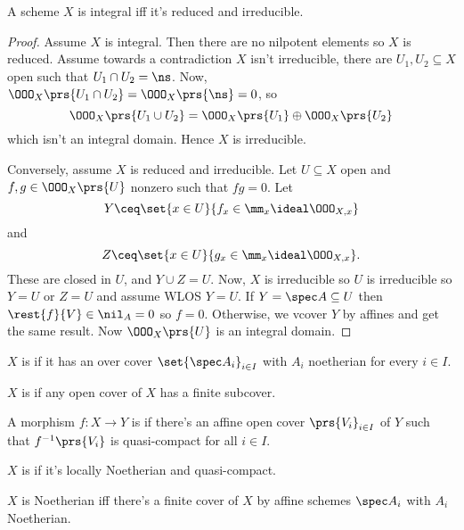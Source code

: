 \documentclass[10pt,a4paper,twoside,openany,hidelinks]{book}
\begin{document}
\begin{proposition}
A scheme $X$ is integral iff it's reduced and irreducible.
\end{proposition}

\begin{proof}
Assume $X$ is integral. Then there are no nilpotent elements so $X$ is reduced.
Assume towards a contradiction $X$ isn't irreducible, there are $U_1, U_2 \subseteq X$ open such that $U_1 \cap U_2 = \ns$.
Now, $\OOO_X\prs{U_1 \cap U_2} = \OOO_X\prs{\ns} = 0$, so
$$\OOO_X\prs{U_1 \cup U_2} = \OOO_X\prs{U_1} \oplus \OOO_X\prs{U_2}$$
which isn't an integral domain.
Hence $X$ is irreducible.

Conversely, assume $X$ is reduced and irreducible. Let $U \subseteq X$ open and $f,g \in \OOO_X\prs{U}$ nonzero such that $fg = 0$.
Let $$Y \ceq \set{x \in U}{f_x \in \mm_x \ideal \OOO_{X,x}}$$
and
$$Z \ceq \set{x \in U}{g_x \in \mm_x \ideal \OOO_{X,x}} \text{.}$$
These are closed in $U$, and $Y \cup Z = U$.
Now, $X$ is irreducible so $U$ is irreducible so $Y = U$ or $Z = U$ and assume WLOS $Y=U$.
If $Y = \spec A \subseteq U$ then $\rest{f}{V} \in \nil_A = 0$ so $f = 0$. Otherwise, we vcover $Y$ by affines and get the same result.
Now $\OOO_X\prs{U}$ is an integral domain.
\end{proof}

\begin{definition}
$X$ is  if it has an over cover $\set{\spec A_i}_{i \in I}$ with $A_i$ noetherian for every $i \in I$.
\end{definition}

\begin{definition}
$X$ is  if any open cover of $X$ has a finite subcover.
\end{definition}

\begin{definition}
A morphism $f \colon X \to Y$ is  if there's an affine open cover $\prs{V_i}_{i \in I}$ of $Y$ such that $f^{-1}\prs{V_i}$ is quasi-compact for all $i \in I$.
\end{definition}

\begin{definition}
$X$ is  if it's locally Noetherian and quasi-compact.
\end{definition}

\begin{remark}
$X$ is Noetherian iff there's a finite cover of $X$ by affine schemes $\spec A_i$ with $A_i$ Noetherian.
\end{remark}
\end{document}
